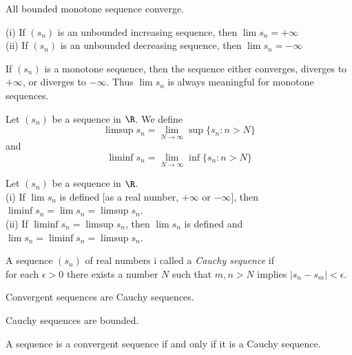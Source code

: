 \documentclass[10pt]{article}
\begin{document}
\begin{thm}
All bounded monotone sequence converge.
\end{thm}

\begin{thm}
(i) If $(s_n)$ is an unbounded increasing sequence, then $\lim s_n = +\infty$\\
(ii) If $(s_n)$ is an unbounded decreasing sequence, then $\lim s_n = -\infty$
\end{thm}

\begin{cor}
If $(s_n)$ is a monotone sequence, then the sequence either converges, diverges to $+\infty$, or diverges to $-\infty$. Thus $\lim s_n$ is always meaningful for monotone sequences.
\end{cor}

\begin{defn}
Let $(s_n)$ be a sequence in $\R$. We define
$$ \limsup s_n = \lim_{N\to\infty} \sup\{s_n : n > N\} $$
and
$$ \liminf s_n = \lim_{N\to\infty} \inf\{s_n : n > N\} $$
\end{defn}

\begin{thm}
Let $(s_n)$ be a sequence in $\R$.\\
(i) If $\lim s_n$ is defined [as a real number, $+\infty$ or $-\infty$], then $\liminf s_n = \lim s_n = \limsup s_n$.\\
(ii) If $\liminf s_n = \limsup s_n$, then $\lim s_n$ is defined and $\lim s_n = \liminf s_n = \limsup s_n$.
\end{thm}

\begin{defn}
A sequence $(s_n)$ of real numbers i called a \emph{Cauchy sequence} if\\
for each $\epsilon > 0$ there exists a number $N$ such that $m,n>N$ implies $|s_n - s_m| < \epsilon$.
\end{defn}

\begin{lem}
Convergent sequences are Cauchy sequences.
\end{lem}

\begin{lem}
Cauchy sequences are bounded.
\end{lem}

\begin{thm}
A sequence is a convergent sequence if and only if it is a Cauchy sequence.
\end{thm}
\end{document}
